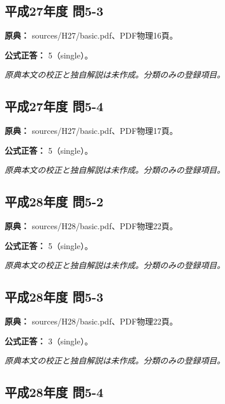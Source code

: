 \subsection{平成27年度 問5-3}
\label{q:h27-reg-basic-5-3}

\noindent\textbf{原典：} sources/H27/basic.pdf、PDF物理16頁。

\textbf{公式正答：} 5（single）。

\par\textit{原典本文の校正と独自解説は未作成。分類のみの登録項目。}

\subsection{平成27年度 問5-4}
\label{q:h27-reg-basic-5-4}

\noindent\textbf{原典：} sources/H27/basic.pdf、PDF物理17頁。

\textbf{公式正答：} 5（single）。

\par\textit{原典本文の校正と独自解説は未作成。分類のみの登録項目。}

\subsection{平成28年度 問5-2}
\label{q:h28-reg-basic-5-2}

\noindent\textbf{原典：} sources/H28/basic.pdf、PDF物理22頁。

\textbf{公式正答：} 5（single）。

\par\textit{原典本文の校正と独自解説は未作成。分類のみの登録項目。}

\subsection{平成28年度 問5-3}
\label{q:h28-reg-basic-5-3}

\noindent\textbf{原典：} sources/H28/basic.pdf、PDF物理22頁。

\textbf{公式正答：} 3（single）。

\par\textit{原典本文の校正と独自解説は未作成。分類のみの登録項目。}

\subsection{平成28年度 問5-4}
\label{q:h28-reg-basic-5-4}

